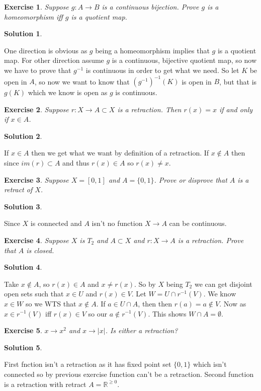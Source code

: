 \documentclass[11pt,a4paper]{article}
\newtheorem{Ex}{Exercise}
\newtheorem{Sol}{Solution}
\newcommand{\R}{\mathbb{R}}
\newcommand{\ra}{\rightarrow}
\begin{document}
\begin{Ex}
	Suppose $g: A \ra B$ is a continuous bijection. Prove $g$ is a homeomorphism iff $g$ is a quotient map.
 \end{Ex} 
\begin{Sol}
\end{Sol}
\noindent One direction is obvious as $g$ being a homeomorphism implies that $g$ is a quotient map. For other direction assume $g$ is a continuous, bijective quotient map, so now we have to prove that $g^{-1}$ is continuous in order to get what we need. So let $K$ be open in $A$, so now we want to know that $(g^{-1})^{-1}(K)$ is open in $B$, but that is $g(K)$ which we know is open as $g$ is continuous.

\begin{Ex}
	Suppose $r: X \ra A \subset X$ is a retraction. Then $r(x) = x$ if and only if $x \in A$.
\end{Ex}

\begin{Sol}
\end{Sol}
\noindent If $x\in A$ then we get what we want by definition of a retraction. If $x\not \in A$ then since $im(r) \subset A$ and thus $r(x) \in A$ so $r(x) \neq x$. 

\begin{Ex}
	Suppose $X = [0,1]$ and $A = \{0,1\}$. Prove or disprove that $A$ is a retract of $X$.
\end{Ex}
\begin{Sol}\end{Sol}
\noindent Since $X$ is connected and $A$ isn't no function $X \ra A$ can be continuous.

\begin{Ex}
	Suppose $X$ is $T_2$ and $A \subset X$ and $r:X \ra A$ is a retraction. Prove that $A$ is closed.
\end{Ex}

\begin{Sol}\end{Sol}

\noindent Take $x \not \in A$, so $r(x) \in A$ and $x \neq r(x)$. So by $X$ being $T_2$ we can get disjoint open sets such that $x\in U$ and $r(x) \in V$. Let $W = U \cap r^{-1}(V)$. We know $x\in W$ so we WTS that $x \not \in A$. If $a \in U \cap A$, then then $r(a) = a \not \in V$. Now as $x \in r^{-1}(V)$ iff $r(x) \in V$ so our $a \not\in r^{-1}(V)$. This shows $W \cap A = \emptyset$.

\begin{Ex}
	$x \ra x^2$ and $x \ra |x|$. Is either a retraction? 
\end{Ex} 


\begin{Sol}
\end{Sol}
\noindent First fnction isn't a retraction as it has fixed point set $\{0,1\}$ which isn't connected so by previous exercise function can't be a retraction. Second function is a retraction with retract $A = \R^{\ge 0}$.
\end{document}
